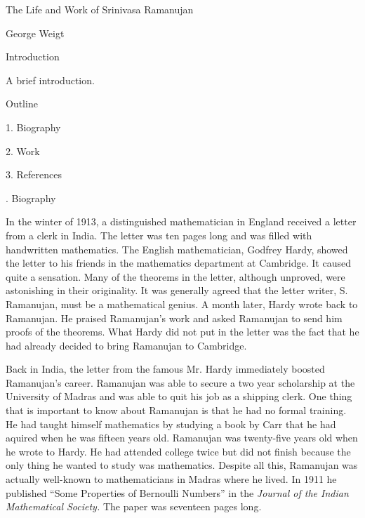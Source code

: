 \centerline{The Life and Work of Srinivasa Ramanujan}
\centerline{George Weigt}

\beginsection Introduction

A brief introduction.

\beginsection Outline

\item{1.}
Biography
\item{2.}
Work
\item{3.}
References

. Biography

In the winter of 1913, a distinguished mathematician in England
received a letter from a clerk in India.
The letter was ten pages long and was filled with handwritten
mathematics.
The English mathematician, Godfrey Hardy, showed the letter to his friends in the
mathematics department at Cambridge.
It caused quite a sensation.
Many of the theorems in the letter, although unproved,
were astonishing in their originality.
It was generally agreed that the letter writer, S. Ramanujan,
must be a mathematical genius.
A month later, Hardy wrote back to Ramanujan.
He praised Ramanujan's work and asked Ramanujan to send him
proofs of the theorems.
What Hardy did not put in the letter was the fact that he
had already decided to bring Ramanujan to Cambridge.

Back in India, the letter from the famous Mr. Hardy immediately
boosted Ramanujan's career.
Ramanujan was able to secure a two year scholarship at the University of
Madras and was able to quit his job as a shipping clerk.
One thing that is important to know about Ramanujan is that he
had no formal training.
He had taught himself mathematics by studying a book by Carr
that he had aquired when he was fifteen years old.
Ramanujan was twenty-five years old when he wrote to Hardy.
He had attended college twice but did not finish because
the only thing he wanted to study was mathematics.
Despite all this, Ramanujan was actually well-known to mathematicians
in Madras where he lived.
In 1911 he published ``Some Properties of Bernoulli Numbers'' in the
{\it Journal of the Indian Mathematical Society.}
The paper was seventeen pages long.

